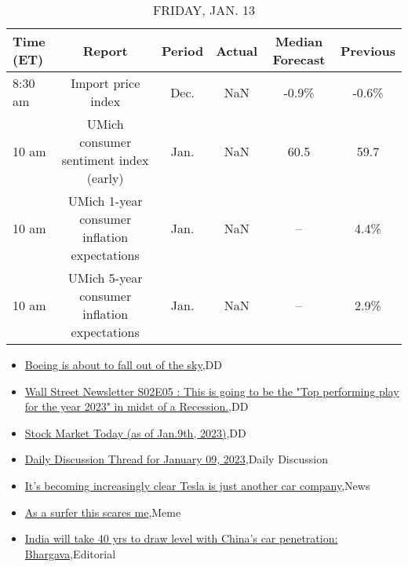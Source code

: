 \documentclass{article}%
\begin{document}
\begin{table}[htbp]%
\caption{FRIDAY, JAN. 13}%
\centering%
\begin{adjustbox}{width=1\textwidth}%
\begin{tabular}{lccccc}
\toprule
Time (ET) &                                       Report & Period & Actual & Median Forecast & Previous \\
\midrule
  8:30 am &                           Import price index &   Dec. &    NaN &           -0.9\% &    -0.6\% \\
    10 am &       UMich consumer sentiment index (early) &   Jan. &    NaN &            60.5 &     59.7 \\
    10 am & UMich 1-year consumer inflation expectations &   Jan. &    NaN &              -- &     4.4\% \\
    10 am & UMich 5-year consumer inflation expectations &   Jan. &    NaN &              -- &     2.9\% \\
\bottomrule
\end{tabular}
%
\end{adjustbox}%
\end{table}

%
\begin{itemize}%
\item%
\href{https://reddit.com/r/wallstreetbets/comments/107djis/boeing\_is\_about\_to\_fall\_out\_of\_the\_sky/}{Boeing is about to fall out of the sky},DD%
\item%
\href{https://reddit.com/r/wallstreetbets/comments/107cz8k/wall\_street\_newsletter\_s02e05\_this\_is\_going\_to\_be/}{Wall Street Newsletter S02E05 : This is going to be the "Top performing play for the year 2023" in midst of a Recession.},DD%
\item%
\href{https://reddit.com/r/wallstreetbets/comments/107c86y/stock\_market\_today\_as\_of\_jan9th\_2023/}{Stock Market Today (as of Jan.9th, 2023)},DD%
\item%
\href{https://reddit.com/r/wallstreetbets/comments/107bnim/daily\_discussion\_thread\_for\_january\_09\_2023/}{Daily Discussion Thread for January 09, 2023},Daily Discussion%
\item%
\href{https://reddit.com/r/wallstreetbets/comments/107af81/its\_becoming\_increasingly\_clear\_tesla\_is\_just/}{It's becoming increasingly clear Tesla is just another car company},News%
\item%
\href{https://reddit.com/r/wallstreetbets/comments/107ad68/as\_a\_surfer\_this\_scares\_me/}{As a surfer this scares me},Meme%
\item%
\href{https://reddit.com/r/Economics/comments/10768lg/india\_will\_take\_40\_yrs\_to\_draw\_level\_with\_chinas/}{India will take 40 yrs to draw level with China's car penetration: Bhargava},Editorial%
\end{itemize}%
\end{document}

